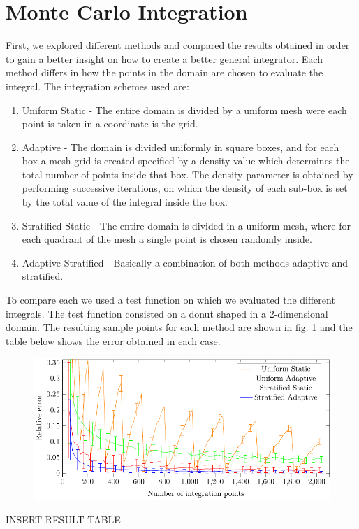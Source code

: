 

\section{Monte Carlo Integration}

First, we explored different methods and compared the results obtained
in order to gain a better insight on how to create a better general integrator. Each method differs in how
the points in the domain are chosen to evaluate the integral.
The integration schemes \cite{MCmethods} used are:
\begin{enumerate}
  \item Uniform Static - The entire domain is divided by a uniform mesh were each point is taken in a coordinate is the grid.
  \item Adaptive - The domain is divided uniformly in square boxes, and for each box a mesh grid is created
  specified by a density value which determines the total number of points inside that box. The density parameter
  is obtained by performing successive iterations, on which the density of each sub-box is set by the total value of the integral inside
  the box.
  \item Stratified Static - The entire domain is divided in a uniform mesh, where for each quadrant of the mesh
  a single point is chosen randomly inside.
  \item Adaptive Stratified - Basically a combination of both methods adaptive and stratified.
\end{enumerate}

To compare each we used a test function on which we evaluated the different integrals.
The test function consisted on a donut shaped  in a 2-dimensional domain. The resulting
sample points for each method are shown in fig. \ref{} and the table below shows the error
obtained in each case.

\begin{figure}
  \begin{center}
  \includegraphics[scale=1 ]{graphs/graphtest.pdf}
  \caption{}
  \label{}
  \end{center}
\end{figure}

INSERT RESULT TABLE
